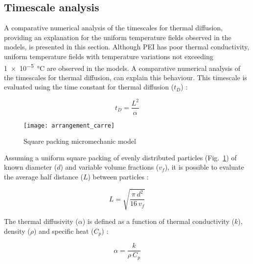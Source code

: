 \FloatBarrier
\subsection*{Timescale analysis}
\label{sec:timeconstant}

A comparative numerical analysis of the timescales for thermal diffusion, providing an explanation for the uniform temperature fields observed in the models, is presented in this section. 
Although PEI has poor thermal conductivity, uniform temperature fields with temperature variations not exceeding \SI{1e-5}{\celsius} are observed in the models. 
A comparative numerical analysis of the timescales for thermal diffusion, can explain this behaviour. 
This timescale is evaluated using the time constant for thermal diffusion ($t_D$) : 

\begin{equation}
t_D = \frac{L^2}{\alpha}
\label{equa:time_constant}
\end{equation}

\begin{figure}[htb]
	\center
	\captionsetup{width=35mm}
	\texttt{[image: arrangement\_carre]}
	\caption{Square packing micromechanic model \cite{Brassard2018_figshare_article1}}
	\label{fig:square_packing}
\end{figure}

Assuming a uniform square packing of evenly distributed particles (Fig.~\ref{fig:square_packing}) of known diameter ($d$) and variable volume fractions ($v_f$), it is possible to evaluate the average half distance ($L$) between particles :

\begin{equation}
L = \sqrt{\frac{\pi \ d^2}{16 \ v_f}}
\label{equa:L_average}
\end{equation}

The thermal diffusivity ($\alpha$) is defined as a function of thermal conductivity ($k$), density ($\rho$) and specific heat ($C_p$) : 

\begin{equation}
\alpha = \frac{k}{\rho \ C_p}
\label{equa:thermal_diffusivity}
\end{equation}

